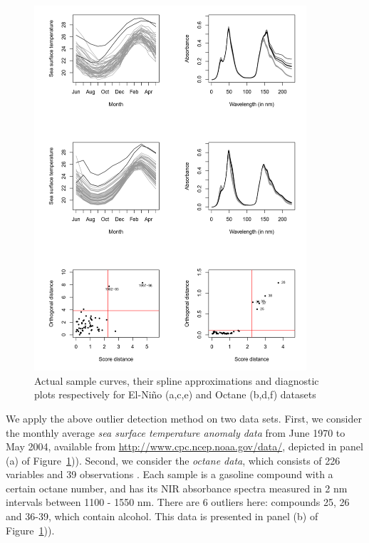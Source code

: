 \begin{figure}
\begin{center}
\includegraphics[width=0.9\textwidth]{plot2}
\caption{Actual sample curves, their spline approximations and diagnostic plots respectively for El-Ni\~no (a,c,e) and Octane (b,d,f) datasets}
\label{fig:fPCAfig}
\end{center}
\end{figure}

We apply the above outlier detection method on two data sets. First, we consider the 
monthly average \textit{sea surface temperature anomaly data} 
from June 1970 to May 2004, available 
from \url{http://www.cpc.ncep.noaa.gov/data/}, depicted in  panel (a) 
of Figure~\ref{fig:fPCAfig})).
Second, we consider the \textit{octane data}, which consists of 226 variables and 39 
observations \citep{ref:EsbensenetalBook94}. 
Each sample is a gasoline compound with a certain octane 
number, and has its NIR absorbance spectra measured in 2 nm intervals between 1100 - 1550 
nm. There are 6 outliers here: compounds 25, 26 and 36-39, which contain alcohol. This 
data is presented in  panel (b) of Figure~\ref{fig:fPCAfig})).

